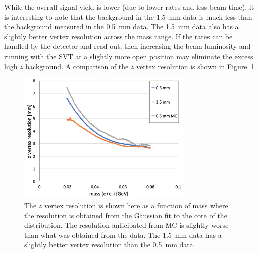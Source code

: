%
%
While the overall signal yield is lower (due to lower rates and less beam time), it is interesting to note that the background in the 1.5~mm data is much less than the background measured in the 0.5~mm data. The 1.5~mm data also has a slightly better vertex resolution across the mass range. If the rates can be handled by the detector and read out, then increasing the beam luminosity and running with the SVT at a slightly more open position may eliminate the excess high $z$ background. A comparison of the $z$ vertex resolution is shown in Figure~\ref{fig:vtxRes}. 

\begin{figure}[htb]
  \centering
      \includegraphics[width=0.75\textwidth]{pics/results/vtxRes.png}
  \caption[Vertex resolutions as measured in data and compared]{The $z$ vertex resolution is shown here as a function of mass where the resolution is obtained from the Gaussian fit to the core of the distribution. The resolution anticipated from MC is slightly worse than what was obtained from the data. The 1.5~mm data has a slightly better vertex resolution than the 0.5~mm data.}
  \label{fig:vtxRes}
\end{figure}

